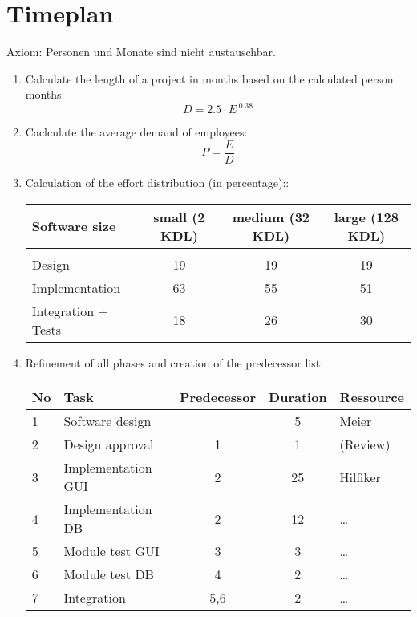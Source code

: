 \section{Timeplan}
Axiom: Personen und Monate sind nicht austauschbar.
\begin{enumerate}
\item Calculate the length of a project in months based on the calculated
person months:
\begin{equation}
 D = 2.5 \cdot E ^{\;0.38}
\end{equation}
\item Caclculate the average demand of employees:
\begin{equation}
 P = \frac{E}{D}
\end{equation}
\ifslides
\newpage
\fi
\item Calculation of the effort distribution (in percentage)::\\[1.5ex]
\begin{tabular}{|lccc|}\hline
Software size & small (2 KDL) & medium (32 KDL) & large (128 KDL)\\ \hline
 & & & \\
Design & 19 & 19 & 19 \\
Implementation & 63 & 55 & 51 \\
Integration + Tests & 18 & 26 & 30 \\ \hline
\end{tabular}
\ifslides
\newpage
\fi
\item Refinement of all phases and creation of the predecessor list:
\begin{center}
\begin{tabular}{|l|l|c|c|l|}
\hline
No & Task & Predecessor & Duration & Ressource \\
\hline
1   & Software design &    & 5  & Meier \\
2   & Design approval & 1 & 1 & (Review) \\
3   & Implementation GUI & 2 & 25 & Hilfiker \\
4   & Implementation DB  & 2 & 12 & \ldots   \\
5   & Module test GUI &    3 & 3 & \ldots \\
6   & Module test DB  &    4 & 2 & \ldots \\
7   & Integration   &    5,6 & 2 & \ldots \\
\hline
\end{tabular}
\end{center}
\end{enumerate}

